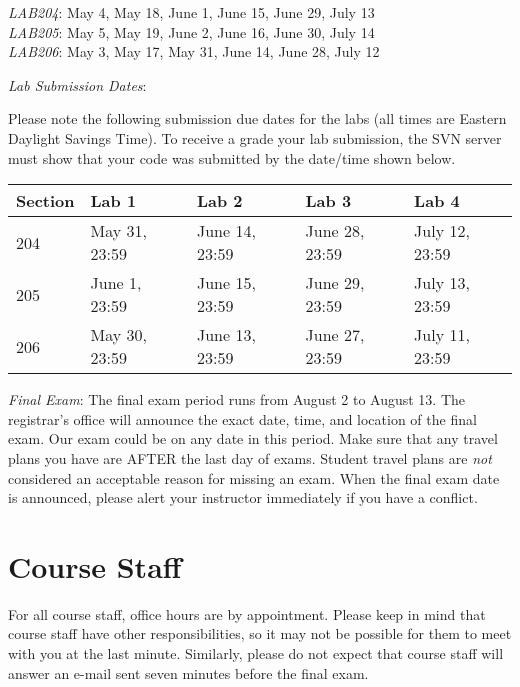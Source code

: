 \documentclass[letterpaper,10pt]{article}
\begin{document}
\textit{LAB204}: May 4, May 18, June 1, June 15, June 29, July 13 \\
\textit{LAB205}: May 5, May 19, June 2, June 16, June 30, July 14 \\
\textit{LAB206}: May 3, May 17, May 31, June 14, June 28, July 12 

\textit{Lab Submission Dates}:

Please note the following submission due dates for the labs (all times are Eastern Daylight Savings Time). To receive a grade your lab submission, the SVN server must show that your code was submitted by the date/time shown below. \\

\begin{table}[h]
        \begin{center}
        \begin{tabular}{l|l|l|l|l}
        	\textbf{Section} & \textbf{Lab 1} & \textbf{Lab 2} & \textbf{Lab 3} & \textbf{Lab 4} \\
			\hline
			204 & May 31, 23:59 & June 14, 23:59 & June 28, 23:59 & July 12, 23:59 \\
			\hline
			205 & June 1, 23:59 & June 15, 23:59 & June 29, 23:59 & July 13, 23:59 \\
			\hline
			206 & May 30, 23:59 & June 13, 23:59 & June 27, 23:59 & July 11, 23:59 \\
        \end{tabular}
        \end{center}
\end{table}

\textit{Final Exam}: The final exam period runs from August 2 to August 13. The registrar's office will announce the exact date, time, and location of the final exam. Our exam could be on any date in this period. Make sure that any travel plans you have are AFTER the last day of exams. Student travel plans are \emph{not} considered an acceptable reason for missing an exam. When the final exam date is announced, please alert your instructor immediately if you have a conflict.

\section*{Course Staff}

For all course staff, office hours are by appointment. Please keep in mind that course staff have other responsibilities, so it may not be possible for them to meet with you at the last minute. Similarly, please do not expect that course staff will answer an e-mail sent seven minutes before the final exam.
\end{document}
